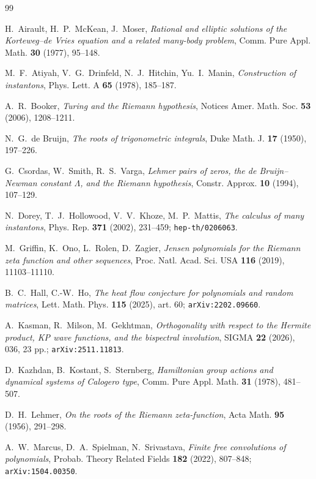 \documentclass[11pt]{amsart}
\theoremstyle{remark}
\begin{document}
\begin{thebibliography}{99}

 H.~Airault, H.~P.~McKean, J.~Moser, \emph{Rational and elliptic solutions of the Korteweg--de Vries equation and a related many-body problem}, Comm. Pure Appl. Math. \textbf{30} (1977), 95--148.

 M.~F.~Atiyah, V.~G.~Drinfeld, N.~J.~Hitchin, Yu.~I.~Manin, \emph{Construction of instantons}, Phys. Lett. A \textbf{65} (1978), 185--187.

 A.~R.~Booker, \emph{Turing and the Riemann hypothesis}, Notices Amer. Math. Soc. \textbf{53} (2006), 1208--1211.

 N.~G.~de Bruijn, \emph{The roots of trigonometric integrals}, Duke Math. J. \textbf{17} (1950), 197--226.

 G.~Csordas, W.~Smith, R.~S.~Varga, \emph{Lehmer pairs of zeros, the de Bruijn--Newman constant $\Lambda$, and the Riemann hypothesis}, Constr. Approx. \textbf{10} (1994), 107--129.

 N.~Dorey, T.~J.~Hollowood, V.~V.~Khoze, M.~P.~Mattis, \emph{The calculus of many instantons}, Phys. Rep. \textbf{371} (2002), 231--459; \texttt{hep-th/0206063}.

 M.~Griffin, K.~Ono, L.~Rolen, D.~Zagier, \emph{Jensen polynomials for the Riemann zeta function and other sequences}, Proc. Natl. Acad. Sci. USA \textbf{116} (2019), 11103--11110.

 B.~C.~Hall, C.-W.~Ho, \emph{The heat flow conjecture for polynomials and random matrices}, Lett. Math. Phys. \textbf{115} (2025), art. 60; \texttt{arXiv:2202.09660}.

 A.~Kasman, R.~Milson, M.~Gekhtman, \emph{Orthogonality with respect to the Hermite product, KP wave functions, and the bispectral involution}, SIGMA \textbf{22} (2026), 036, 23 pp.; \texttt{arXiv:2511.11813}.

 D.~Kazhdan, B.~Kostant, S.~Sternberg, \emph{Hamiltonian group actions and dynamical systems of Calogero type}, Comm. Pure Appl. Math. \textbf{31} (1978), 481--507.

 D.~H.~Lehmer, \emph{On the roots of the Riemann zeta-function}, Acta Math. \textbf{95} (1956), 291--298.

 A.~W.~Marcus, D.~A.~Spielman, N.~Srivastava, \emph{Finite free convolutions of polynomials}, Probab. Theory Related Fields \textbf{182} (2022), 807--848; \texttt{arXiv:1504.00350}.


\end{thebibliography}
\end{document}
